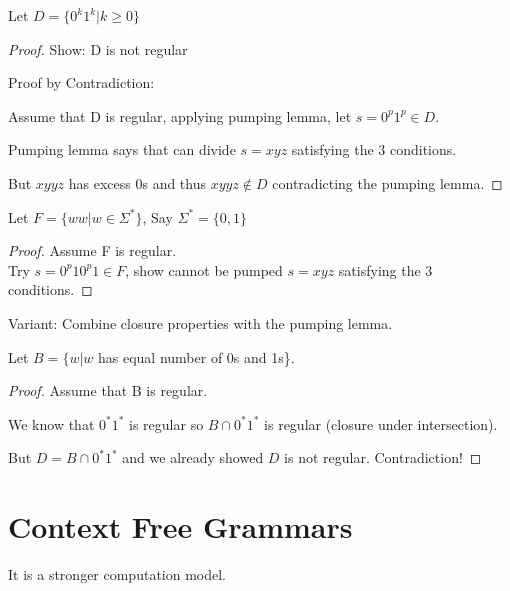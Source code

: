 \begin{eg}
    Let \(D = \{ 0^k1^k | k \geq 0 \} \) 
\end{eg}
\begin{proof}
    Show: D is not regular

    Proof by Contradiction:

    Assume that D is regular, applying pumping lemma, let \(s = 0^p1^p \in D\). 

    Pumping lemma says that can divide \(s = xyz\) satisfying the 3 conditions.

    But \(xyyz\) has excess 0s and thus \(xyyz \notin D\) contradicting the pumping lemma.  
\end{proof}

\begin{eg}
    Let \(F = \{ ww| w \in \Sigma^* \} \), Say \(\Sigma^* = \{ 0, 1 \} \)  
\end{eg}
\begin{proof}
    Assume F is regular.\\
    Try \(s = 0^p10^p1 \in F\), show cannot be pumped \(s = xyz\) satisfying the 3 conditions.  
\end{proof}

Variant: Combine closure properties with the pumping lemma.

\begin{eg}
    Let \(B = \{ w | w \)  has equal number of 0s and 1s\}.
\end{eg}
\begin{proof}
    Assume that B is regular.

    We know that \(0^*1^*\) is regular so  \(B \cap 0^*1^*\) is regular (closure under intersection). 

    But \(D = B \cap 0^*1^*\) and we already showed \(D\) is not regular. Contradiction!
\end{proof}


\section{Context Free Grammars}

It is a stronger computation model.


